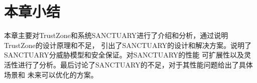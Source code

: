 
\section{本章小结}

本章主要对TrustZone和系统SANCTUARY进行了介绍和分析，通过说明TrustZone的设计原理和不足，
引出了SANCTUARY的设计和解决方案。说明了SANCTUARY分威胁模型和安全保证。对SANCTUARY的性能
可扩展性以及灵活性进行了分析。最后讨论了SANCTUARY的不足，对于其性能问题给出了具体场景和
未来可以优化的方案。

